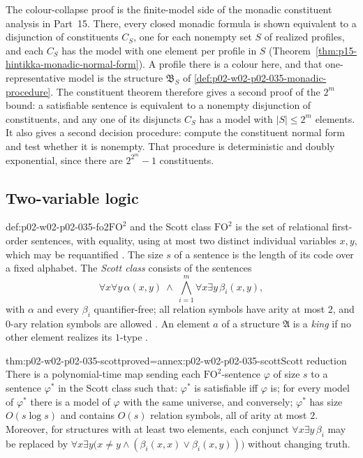 The colour-collapse proof is the finite-model side of the monadic
constituent analysis in Part~15.  There, every closed monadic formula is
shown equivalent to a disjunction of constituents \(C_S\), one for each
nonempty set \(S\) of realized profiles, and each \(C_S\) has the model with
one element per profile in \(S\)
(Theorem~\ref{thm:p15-hintikka-monadic-normal-form}).  A profile there is a
colour here, and that one-representative model is the structure
\(\mathfrak B_S\) of \cref{def:p02-w02-p02-035-monadic-procedure}.  The
constituent theorem therefore gives a second proof of the \(2^m\) bound: a
satisfiable sentence is equivalent to a nonempty disjunction of constituents,
and any one of its disjuncts \(C_S\) has a model with \(\lvert S\rvert\leq 2^m\)
elements.  It also gives a second decision procedure: compute the constituent
normal form and test whether it is nonempty.  That procedure is deterministic
and doubly exponential, since there are \(2^{2^m}-1\) constituents.

\subsection{Two-variable logic}
\label{sec:p02-w02-p02-035-fo2}

\begin{hbdefinition}{def:p02-w02-p02-035-fo2}{\(\mathrm{FO}^2\) and the Scott class}
\(\mathrm{FO}^2\) is the set of relational first-order sentences, with
equality, using at most two distinct individual variables \(x,y\), which may
be requantified \cite[sect.~2]{GradelKolaitisVardi1997}.  The size \(s\) of a
sentence is the length of its code over a fixed alphabet.  The \emph{Scott
class} consists of the sentences
\[
 \forall x\forall y\,\alpha(x,y)\ \land\
 \bigwedge_{i=1}^{m}\forall x\exists y\,\beta_i(x,y),
\]
with \(\alpha\) and every \(\beta_i\) quantifier-free; all relation symbols
have arity at most \(2\), and \(0\)-ary relation symbols are allowed
\cite[sect.~4]{GradelKolaitisVardi1997}.  An element \(a\) of a structure
\(\mathfrak A\) is a \emph{king} if no other element realizes its
\(1\)-type \cite[def.~4.2]{GradelKolaitisVardi1997}.
\end{hbdefinition}

\begin{hbtheorem}{thm:p02-w02-p02-035-scott}{proved=annex:p02-w02-p02-035-scott}{Scott reduction}
There is a polynomial-time map sending each \(\mathrm{FO}^2\)-sentence
\(\varphi\) of size \(s\) to a sentence \(\varphi^{*}\) in the Scott class such
that: \(\varphi^{*}\) is satisfiable iff \(\varphi\) is; for every model of
\(\varphi^{*}\) there is a model of \(\varphi\) with the same universe, and
conversely; \(\varphi^{*}\) has size \(O(s\log s)\) and contains \(O(s)\)
relation symbols, all of arity at most \(2\).  Moreover, for structures with
at least two elements, each conjunct \(\forall x\exists y\,\beta_i\) may be
replaced by \(\forall x\exists y\bigl(x\neq y\land(\beta_i(x,x)\lor
\beta_i(x,y))\bigr)\) without changing truth.
\end{hbtheorem}


